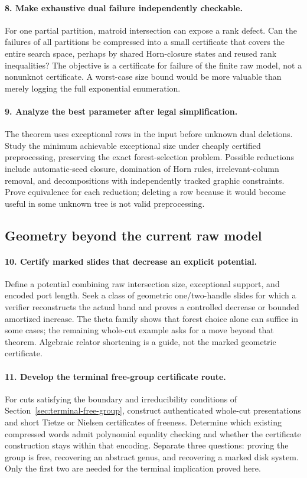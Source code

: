 \paragraph{8. Make exhaustive dual failure independently checkable.}
For one partial partition, matroid intersection can expose a rank defect.
Can the failures of all partitions be compressed into a small certificate
that covers the entire search space, perhaps by shared Horn-closure
states and reused rank inequalities?  The objective is a certificate
for failure of the finite raw model, not a nonunknot certificate.  A
worst-case size bound would be more valuable than merely logging the
full exponential enumeration.

\paragraph{9. Analyze the best parameter after legal simplification.}
The theorem uses exceptional rows in the input before unknown dual
deletions.  Study the minimum achievable exceptional size under cheaply
certified preprocessing, preserving the exact forest-selection problem.
Possible reductions include automatic-seed closure, domination of Horn
rules, irrelevant-column removal, and decompositions with independently
tracked graphic constraints.  Prove equivalence for each reduction;
deleting a row because it would become useful in some unknown tree is
not valid preprocessing.

\subsection{Geometry beyond the current raw model}

\paragraph{10. Certify marked slides that decrease an explicit potential.}
Define a potential combining raw intersection size, exceptional support,
and encoded port length.  Seek a class of geometric one/two-handle
slides for which a verifier reconstructs the actual band and proves a
controlled decrease or bounded amortized increase.  The theta family
shows that forest choice alone can suffice in some cases; the remaining
whole-cut example asks for a move beyond that theorem.  Algebraic
relator shortening is a guide, not the marked geometric certificate.

\paragraph{11. Develop the terminal free-group certificate route.}
For cuts satisfying the boundary and irreducibility conditions of
Section~\ref{sec:terminal-free-group}, construct authenticated whole-cut
presentations and short Tietze or Nielsen certificates of freeness.
Determine which existing compressed words admit polynomial equality
checking and whether the certificate construction stays within that
encoding.  Separate three questions: proving the group is free,
recovering an abstract genus, and recovering a marked disk system.
Only the first two are needed for the terminal implication proved here.

